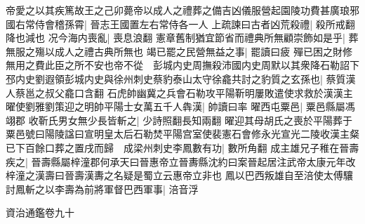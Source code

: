 帝愛之以其疾篤故王之己卯薨帝以成人之禮葬之備吉凶儀服營起園陵功費甚廣琅邪國右常侍會稽孫霄|{
	晉志王國置左右常侍各一人}
上疏諫曰古者凶荒殺禮|{
	殺所戒翻降也減也}
况今海内喪亂|{
	喪息浪翻}
憲章舊制猶宜節省而禮典所無顧崇飾如是乎|{
	葬無服之殤以成人之禮古典所無也}
竭已罷之民營無益之事|{
	罷讀曰疲}
殫已困之財修無用之費此臣之所不安也帝不從　彭城内史周撫殺沛國内史周默以其衆降石勒詔下邳内史劉遐領彭城内史與徐州刺史蔡豹泰山太守徐龕共討之豹質之玄孫也|{
	蔡質漢人蔡邕之叔父龕口含翻}
石虎帥幽冀之兵會石勒攻平陽靳明屢敗遣使求救於漢漢主曜使劉雅劉策迎之明帥平陽士女萬五千人犇漢|{
	帥讀曰率}
曜西屯粟邑|{
	粟邑縣屬馮翊郡}
收靳氏男女無少長皆斬之|{
	少詩照翻長知兩翻}
曜迎其母胡氏之喪於平陽葬于粟邑號曰陽陵諡曰宣明皇太后石勒焚平陽宫室使裴憲石會修永光宣光二陵收漢主粲已下百餘口葬之置戌而歸　成梁州刺史李鳳數有功|{
	數所角翻}
成主雄兄子稚在晉壽疾之|{
	晉壽縣屬梓潼郡何承天曰晉惠帝立晉夀縣沈約曰案晉起居注武帝太康元年改梓潼之漢壽曰晉壽漢夀之名疑是蜀立云惠帝立非也}
鳳以巴西叛雄自至涪使太傅驤討鳳斬之以李壽為前將軍督巴西軍事|{
	涪音浮}


資治通鑑卷九十
